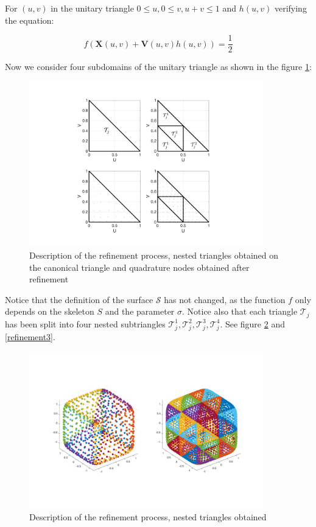 \documentclass[11pt]{article}
\newcommand\bX{\boldsymbol X}
\newcommand\bV{\boldsymbol V}
\begin{document}
For $(u,v)$ in the unitary triangle $0\le u, 0\le v, u+v\le1$ and $h(u,v)$ verifying the equation:

\begin{equation}
f(\bX(u,v)+\bV(u,v)h(u,v))=\frac{1}{2}
\end{equation}

Now we consider four subdomains of the unitary triangle as shown in the figure \ref{refinement1}:

\begin{figure}[H]
\begin{center}
\includegraphics[width=4in]{Triangle_Refine_v2.pdf}
\end{center}
\caption{Description of the refinement process, nested triangles obtained on the canonical triangle and quadrature nodes obtained after refinement}
\label{refinement1}
\end{figure}

Notice that the definition of the surface $\mathcal{S}$ has not changed, as the function $f$ only depends on the skeleton $\mathit{S}$ and the parameter $\sigma$. Notice also that each triangle $\mathcal{T}_j$ has been split into four nested subtriangles $\mathcal{T}_j^1,\mathcal{T}_j^2,\mathcal{T}_j^3,\mathcal{T}_j^4$. See figure \ref{refinement2} and \ref{refinement3}.

\begin{figure}[H]
\begin{center}
\includegraphics[width=4in]{cloud_points_refinement_v2.pdf}%
\end{center}
\caption{Description of the refinement process, nested triangles obtained}
\label{refinement2}
\end{figure}
\end{document}
